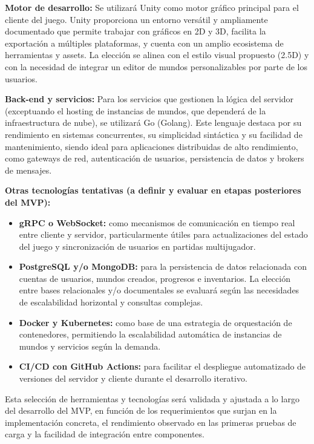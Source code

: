 \textbf{Motor de desarrollo:}
Se utilizará Unity como motor gráfico principal para el cliente del juego. Unity proporciona un entorno versátil y ampliamente documentado que permite trabajar con gráficos
en 2D y 3D, facilita la exportación a múltiples plataformas, y cuenta con un amplio ecosistema de herramientas y assets.
La elección se alinea con el estilo visual propuesto (2.5D) y con la necesidad de integrar un editor de mundos personalizables por parte de los usuarios.
\vspace{0.25cm}

\textbf{Back-end y servicios:}
Para los servicios que gestionen la lógica del servidor (exceptuando el hosting de instancias de mundos, que dependerá de la infraestructura de nube),
se utilizará Go (Golang). Este lenguaje destaca por su rendimiento en sistemas concurrentes, su simplicidad sintáctica y su facilidad de mantenimiento,
siendo ideal para aplicaciones distribuidas de alto rendimiento, como gateways de red, autenticación de usuarios, persistencia de datos y brokers de mensajes.
\vspace{0.25cm}

\textbf{Otras tecnologías tentativas (a definir y evaluar en etapas posteriores del MVP):}
\begin{itemize}
    \item \textbf{gRPC o WebSocket:} como mecanismos de comunicación en tiempo real entre cliente y servidor, particularmente útiles para actualizaciones del estado del juego y
        sincronización de usuarios en partidas multijugador.
    \item \textbf{PostgreSQL y/o MongoDB:} para la persistencia de datos relacionada con cuentas de usuarios, mundos creados, progresos e inventarios.
        La elección entre bases relacionales y/o documentales se evaluará según las necesidades de escalabilidad horizontal y consultas complejas.
    \item \textbf{Docker y Kubernetes:} como base de una estrategia de orquestación de contenedores, permitiendo la escalabilidad automática de instancias de mundos y servicios según la demanda.
    \item \textbf{CI/CD con GitHub Actions:} para facilitar el despliegue automatizado de versiones del servidor y cliente durante el desarrollo iterativo.
\end{itemize}

Esta selección de herramientas y tecnologías será validada y ajustada a lo largo del desarrollo del MVP, en función de los requerimientos que surjan en la implementación concreta,
el rendimiento observado en las primeras pruebas de carga y la facilidad de integración entre componentes.

